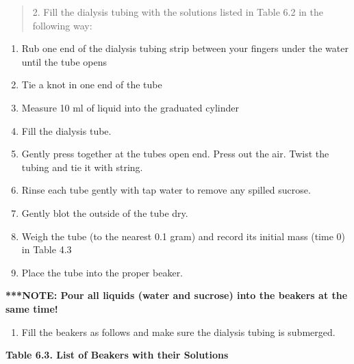 \documentclass[
  letterpaper,
  DIV=11,
  numbers=noendperiod]{scrreprt}
\providecommand{\tightlist}{%
  \setlength{\itemsep}{0pt}\setlength{\parskip}{0pt}}
\begin{document}
\begin{quote}
2. Fill the dialysis tubing with the solutions listed in Table 6.2 in
the following way:
\end{quote}

\begin{enumerate}
\def\labelenumi{\alph{enumi}.}
\item
  Rub one end of the dialysis tubing strip between your fingers under
  the water until the tube opens
\item
  Tie a knot in one end of the tube
\item
  Measure 10 ml of liquid into the graduated cylinder
\item
  Fill the dialysis tube.
\item
  Gently press together at the tube\textquotesingle s open end. Press
  out the air. Twist the tubing and tie it with string.
\item
  Rinse each tube gently with tap water to remove any spilled sucrose.
\item
  Gently blot the outside of the tube dry.
\item
  Weigh the tube (to the nearest 0.1 gram) and record its initial mass
  (time 0) in Table 4.3
\item
  Place the tube into the proper beaker.
\end{enumerate}

\textbf{***NOTE: Pour all liquids (water and sucrose) into the beakers
at the same time!}

\begin{enumerate}
\def\labelenumi{\arabic{enumi}.}
\setcounter{enumi}{2}
\tightlist
\item
  Fill the beakers as follows and make sure the dialysis tubing is
  submerged.
\end{enumerate}

\textbf{Table 6.3. List of Beakers with their Solutions}
\end{document}
